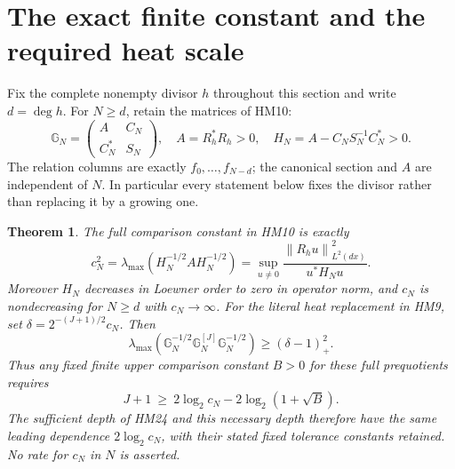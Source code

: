 \documentclass[11pt]{article}
\newtheorem{theorem}{Theorem}\newtheorem{lemma}[theorem]{Lemma}
\newcommand{\C}{\mathbb C}\newcommand{\R}{\mathbb R}
\newcommand{\norm}[1]{\left\lVert#1\right\rVert}
\begin{document}
\section{The exact finite constant and the required heat scale}
Fix the complete nonempty divisor $h$ throughout this section and
write $d=\deg h$. For $N\ge d$, retain the matrices of HM10:
\[
 \mathbb G_N=\begin{pmatrix}A&C_N\\C_N^*&S_N\end{pmatrix},\quad
 A=R_h^*R_h>0,\quad H_N=A-C_NS_N^{-1}C_N^*>0.
\]
The relation columns are exactly $f_0,\ldots,f_{N-d}$; the canonical
section and $A$ are independent of $N$. In particular every statement
below fixes the divisor rather than replacing it by a growing one.

\begin{theorem}
The full comparison constant in HM10 is exactly
\begin{equation}\tag{HD3}
 c_N^2=\lambda_{\max}(H_N^{-1/2}AH_N^{-1/2})
      =\sup_{u\ne0}\frac{\norm{R_hu}_{L^2(dx)}^2}{u^*H_Nu}.
\end{equation}
Moreover $H_N$ decreases in Loewner order to zero in operator norm,
and $c_N$ is nondecreasing for $N\ge d$ with $c_N\to\infty$.
For the literal heat replacement in HM9, set
$\delta=2^{-(J+1)/2}c_N$. Then
\begin{equation}\tag{HD4}
 \lambda_{\max}\!\left(\mathbb G_N^{-1/2}
                \mathbb G_N^{[J]}\mathbb G_N^{-1/2}\right)
       \ge (\delta-1)_+^2.
\end{equation}
Thus any fixed finite upper comparison constant $B>0$ for these full
prequotients requires
\begin{equation}\tag{HD5}
 J+1\ \ge\ 2\log_2 c_N-2\log_2(1+\sqrt B).
\end{equation}
The sufficient depth of HM24 and this necessary depth therefore have
the same leading dependence $2\log_2 c_N$, with their stated fixed
tolerance constants retained. No rate for $c_N$ in $N$ is asserted.
\end{theorem}
\end{document}
